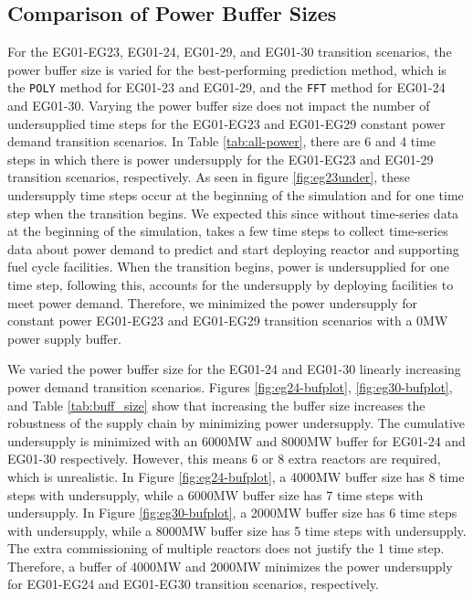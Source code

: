 \subsection{Comparison of Power Buffer Sizes}
For the EG01-EG23, EG01-24, EG01-29, and EG01-30 transition scenarios, 
the power buffer size is varied for the best-performing prediction method, 
which is the \texttt{POLY} method for EG01-23 and EG01-29, and the 
\texttt{FFT} method for EG01-24 and EG01-30. 
Varying the power buffer size does not impact the number of 
undersupplied time steps for the EG01-EG23 and EG01-EG29 constant 
power demand transition scenarios.
In Table \ref{tab:all-power}, there are 6 and 4 time steps
in which there is power undersupply for the EG01-EG23 and EG01-29 
transition scenarios, respectively. 
As seen in figure \ref{fig:eg23under}, these undersupply time 
steps occur at the beginning of the simulation and for one 
time step when the transition begins. 
We expected this since without time-series data 
at the beginning of the simulation, \deploy takes a few 
time steps to collect time-series data about power demand 
to predict and start deploying reactor and supporting 
fuel cycle facilities. 
When the transition begins, power is undersupplied for one 
time step, following this, \deploy accounts for the 
undersupply by deploying facilities to meet power demand.
Therefore, we minimized the power undersupply for constant 
power EG01-EG23 and EG01-EG29 transition scenarios with 
a 0MW power supply buffer. 

We varied the power buffer size for the EG01-24 and EG01-30 
linearly increasing power demand transition scenarios. 
Figures \ref{fig:eg24-bufplot}, \ref{fig:eg30-bufplot}, 
and Table \ref{tab:buff_size} 
show that increasing the buffer size increases the robustness 
of the supply chain by minimizing power undersupply. 
The cumulative undersupply is minimized with an 6000MW and 8000MW 
buffer for EG01-24 and EG01-30 respectively.
However, this means 6 or 8 extra reactors are required, which 
is unrealistic.
In Figure \ref{fig:eg24-bufplot}, a 4000MW buffer size has 
8 time steps with undersupply, while a 6000MW buffer size has 
7 time steps with undersupply. 
In Figure \ref{fig:eg30-bufplot}, a 2000MW buffer size has 
6 time steps with undersupply, while a 8000MW buffer size has 
5 time steps with undersupply. 
The extra commissioning of multiple reactors does not justify the 1 time 
step. 
Therefore, a buffer of 4000MW and 2000MW minimizes 
the power undersupply for EG01-EG24 and EG01-EG30 transition 
scenarios, respectively.

